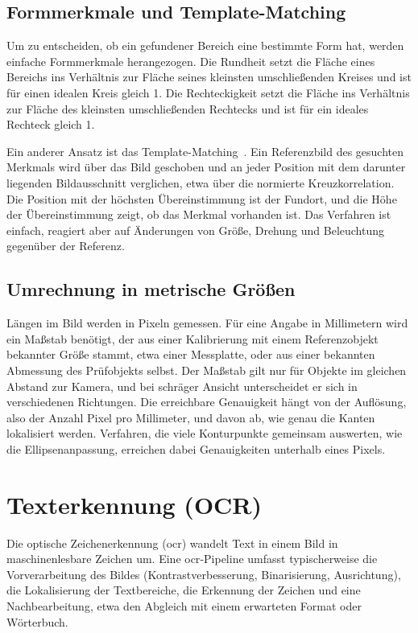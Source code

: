 \subsection{Formmerkmale und Template-Matching}

Um zu entscheiden, ob ein gefundener Bereich eine bestimmte Form hat, werden einfache
Formmerkmale herangezogen. Die Rundheit setzt die Fläche eines Bereichs ins Verhältnis zur
Fläche seines kleinsten umschließenden Kreises und ist für einen idealen Kreis gleich 1. Die
Rechteckigkeit setzt die Fläche ins Verhältnis zur Fläche des kleinsten umschließenden
Rechtecks und ist für ein ideales Rechteck gleich 1.

Ein anderer Ansatz ist das Template-Matching~\cite{brunelli2009}. Ein Referenzbild des
gesuchten Merkmals wird über das Bild geschoben und an jeder Position mit dem darunter
liegenden Bildausschnitt verglichen, etwa über die normierte Kreuzkorrelation. Die Position mit
der höchsten Übereinstimmung ist der Fundort, und die Höhe der Übereinstimmung zeigt, ob das
Merkmal vorhanden ist. Das Verfahren ist einfach, reagiert aber auf Änderungen von Größe,
Drehung und Beleuchtung gegenüber der Referenz.

\subsection{Umrechnung in metrische Größen}

Längen im Bild werden in Pixeln gemessen. Für eine Angabe in Millimetern wird ein Maßstab
benötigt, der aus einer Kalibrierung mit einem Referenzobjekt bekannter Größe stammt, etwa
einer Messplatte, oder aus einer bekannten Abmessung des Prüfobjekts selbst. Der Maßstab gilt
nur für Objekte im gleichen Abstand zur Kamera, und bei schräger Ansicht unterscheidet er sich
in verschiedenen Richtungen. Die erreichbare Genauigkeit hängt von der Auflösung, also der
Anzahl Pixel pro Millimeter, und davon ab, wie genau die Kanten lokalisiert werden. Verfahren,
die viele Konturpunkte gemeinsam auswerten, wie die Ellipsenanpassung, erreichen dabei
Genauigkeiten unterhalb eines Pixels.

\section{Texterkennung (OCR)}
\label{sec:ocr}

Die optische Zeichenerkennung (\ac{ocr}) wandelt Text in einem Bild in maschinenlesbare
Zeichen um. Eine \ac{ocr}-Pipeline umfasst typischerweise die Vorverarbeitung des Bildes
(Kontrastverbesserung, Binarisierung, Ausrichtung), die Lokalisierung der Textbereiche, die
Erkennung der Zeichen und eine Nachbearbeitung, etwa den Abgleich mit einem erwarteten Format
oder Wörterbuch.

